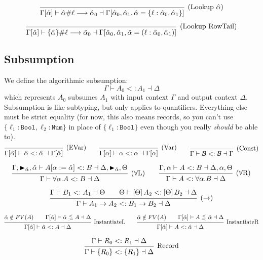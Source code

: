 \documentclass{article}
\newcommand{\spc}{\qquad}
\newcommand{\lbl}{\ell}
\newcommand{\marker}[1]{\RHD_{#1}}
\newcommand{\ev}{\hat}
\newcommand{\ctxinout}[3]{#1 \vdash #2 \dashv #3}
\newcommand{\subsume}{<:}
\newcommand{\subsumes}[4]{\ctxinout {#1} {#2 \subsume #3} {#4}}
\newcommand{\B}{\mathcal{B}}
\newcommand{\instLSymbol}{\;\substack{<\\:=}\;}
\newcommand{\instRSymbol}{\;\substack{<\\=:}\;}
\newcommand{\apply}[1]{\left[#1\right]}
\newcommand{\instL}[4]{#1 \vdash #2 \instLSymbol #3 \dashv #4}
\newcommand{\instR}[4]{#1 \vdash #2 \instRSymbol #3 \dashv #4}
\newcommand{\lookup}[5]{#1 \vdash #2 \# #3 \longrightarrow #4 \dashv #5}
\newcommand{\deduct}[3][]
{
  \begin{prooftree}
    \hypo{#2}
    \infer1[\text{#1}]{#3}
  \end{prooftree}
}
\begin{document}
\[
\deduct[(Lookup \(\ev\alpha\))]
  { }
  { \lookup
      {\Gamma[\ev\alpha]}
      {\ev\alpha}
      {\lbl}
      {\ev\alpha_0}
      {\Gamma[\ev\alpha_0, \ev\alpha_1, \ev\alpha = \{\lbl : \ev\alpha_0, \ev\alpha_1\}] }
  }
\]

\[
\deduct[(Lookup RowTail)]
  { }
  { \lookup
      {\Gamma[\ev\alpha]}
      {\{\ev\alpha\}}
      {\lbl}
      {\ev\alpha_0}
      {\Gamma[\ev\alpha_0, \ev\alpha_1, \ev\alpha = (\lbl : \ev\alpha_0, \ev\alpha_1)] }
  }
\]

\subsection{Subsumption}
We define the algorithmic subsumption:
\[
\subsumes{\Gamma}{A_0}{A_1}{\Delta}
\]
which represents $A_0$ subsumes $A_1$ with input context $\Gamma$ and output
context $\Delta$. Subsumption is like subtyping, but only applies to
quantifiers. Everything else must be strict equality (for now, this also means
records, so you can't use \(\{\lbl_1: \texttt{Bool}, \lbl_2: \texttt{Num}\}\) in
place of \(\{\lbl_1 : \texttt{Bool}\}\) even though you really \emph{should} be
able to).
\[
  \deduct[(EVar)]{}{\subsumes{\Gamma[\ev\alpha]}{\ev\alpha}{\ev\alpha}{\Gamma[\ev\alpha]}}
  \spc
  \deduct[(Var)]{}{\subsumes{\Gamma[\alpha]}{\alpha}{\alpha}{\Gamma[\alpha]}}
  \spc
  \deduct[(Const)]{}{\subsumes{\Gamma}{\B}{\B}{\Gamma}}
\]

\[
  \deduct[(\(\forall\)L)]
  { \subsumes{\Gamma, \marker{\ev\alpha}, \ev\alpha}{A[\alpha := \ev\alpha]}{B}{\Delta, \marker{\ev\alpha}, \Theta} }
  { \subsumes{\Gamma}{\forall \alpha. A}{B}{\Delta} }
  \spc
  \deduct[(\(\forall\)R)]
  { \subsumes{\Gamma, \alpha}{A}{B}{\Delta, \alpha, \Theta} }
  { \subsumes{\Gamma}{A}{\forall \alpha. B}{\Delta} }
\]

\[
  \deduct[(\(\to\))]
  { \subsumes{\Gamma}{B_1}{A_1}{\Theta} \spc \subsumes{\Theta}{\apply\Theta A_2}{\apply\Theta B_2}{\Delta} }
  { \subsumes{\Gamma}{A_1 \to A_2}{B_1 \to B_2}{\Delta} }
\]

\[
  \deduct[InstantiateL]
  {\ev \alpha \notin FV(A) \spc \instL{\Gamma[\ev \alpha]}{\ev
      \alpha}{A}{\Delta}}
  {\subsumes{\Gamma[\ev \alpha]}{\ev \alpha}{A}{\Delta}}
  \spc
  \deduct[InstantiateR]
  {\ev \alpha \notin FV(A) \spc \instR{\Gamma[\ev \alpha]}{A}{\ev
      \alpha}{\Delta}}
  {\subsumes{\Gamma[\ev \alpha]}{A}{\ev \alpha}{\Delta}}
\]

\[
  \deduct[Record]{\subsumes{\Gamma}{R_0}{R_1}{\Delta}}{\subsumes{\Gamma}{\{R_0\}}{\{R_1\}}{\Delta}}
\]
\end{document}
